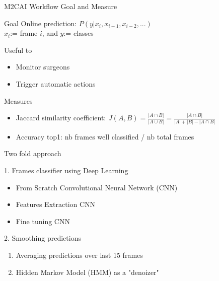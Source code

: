\begin{frame}{M2CAI Workflow Goal and Measure}
	
		\begin{block}{Goal}
	  	Online prediction: $P(y | x_i, x_{i-1}, x_{i-2}, ...)$   \\
		$x_i$:= frame $i$, and $y$:= classes
		\end{block}
		
		
		
		\begin{block}{Useful to}
		\begin{itemize}
			\item Monitor surgeons
			\item Trigger automatic actions
		\end{itemize}
		\end{block}
		
		\begin{block}{Measures}
		\begin{itemize}
			\item Jaccard similarity coefficient:
	    $J(A,B) = \frac{| A \cap B |}{| A \cup B|} = \frac{| A \cap B |}{| A| + |B| - |A \cap B|}$
	    
	  		\item Accuracy top1: nb frames well classified / nb total frames
	  	\end{itemize}
	  	\end{block}
		
\end{frame}

\begin{frame}{Two fold approach}

	\begin{block}{1. Frames classifier using Deep Learning}
	\begin{itemize}
		\item From Scratch Convolutional Neural Network (CNN)
		\item Features Extraction CNN 
		\item Fine tuning CNN
	\end{itemize}
	\end{block}
	
	\begin{block}{2. Smoothing predictions}
	\begin{enumerate}	
		\item Averaging predictions over last 15 frames %
		\item Hidden Markov Model (HMM) as a "denoizer" 
	\end{enumerate}
	\end{block}
	
\end{frame}


